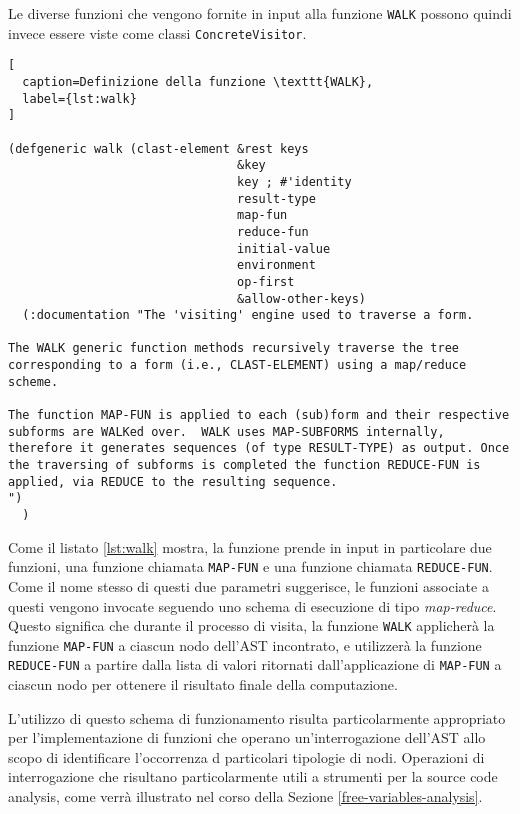 Le diverse funzioni che vengono fornite in input alla funzione \texttt{WALK}
possono quindi invece essere viste come classi \texttt{ConcreteVisitor}.

\begin{lstlisting}[
  caption=Definizione della funzione \texttt{WALK},
  label={lst:walk}
]

(defgeneric walk (clast-element &rest keys
                                &key
                                key ; #'identity
                                result-type
                                map-fun
                                reduce-fun
                                initial-value
                                environment
                                op-first
                                &allow-other-keys)
  (:documentation "The 'visiting' engine used to traverse a form.

The WALK generic function methods recursively traverse the tree
corresponding to a form (i.e., CLAST-ELEMENT) using a map/reduce
scheme.

The function MAP-FUN is applied to each (sub)form and their respective
subforms are WALKed over.  WALK uses MAP-SUBFORMS internally,
therefore it generates sequences (of type RESULT-TYPE) as output. Once
the traversing of subforms is completed the function REDUCE-FUN is
applied, via REDUCE to the resulting sequence.
")
  )

\end{lstlisting}

Come il listato \ref{lst:walk} mostra, la funzione prende in input in
particolare due funzioni, una funzione chiamata \texttt{MAP-FUN} e una funzione
chiamata \texttt{REDUCE-FUN}. Come il nome stesso di questi due parametri
suggerisce, le funzioni associate a questi vengono invocate seguendo uno schema
di esecuzione di tipo \textit{map-reduce}. Questo significa che durante il
processo di visita, la funzione \texttt{WALK} applicherà la funzione \texttt
{MAP-FUN} a ciascun nodo dell'AST incontrato, e utilizzerà la funzione \texttt
{REDUCE-FUN} a partire dalla lista di valori ritornati dall'applicazione di
\texttt{MAP-FUN} a ciascun nodo per ottenere il risultato finale della
computazione.

L'utilizzo di questo schema di funzionamento risulta particolarmente appropriato
per l'implementazione di funzioni che operano un'interrogazione dell'AST allo
scopo di identificare l'occorrenza d particolari tipologie di nodi. Operazioni
di interrogazione che risultano particolarmente utili a strumenti per la source
code analysis, come verrà illustrato nel corso della Sezione
\ref{free-variables-analysis}.

